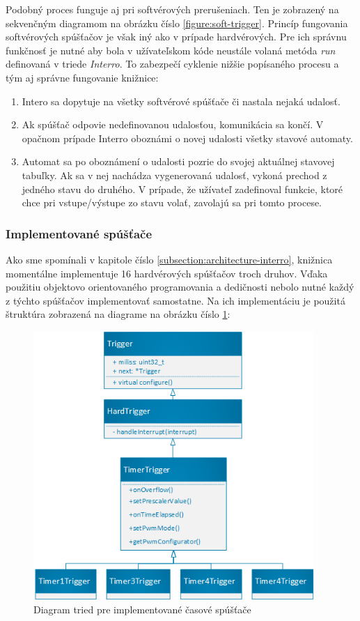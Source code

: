 Podobný proces funguje aj pri softvérových prerušeniach. Ten je zobrazený na sekvenčným diagramom na obrázku číslo \ref{figure:soft-trigger}.
Princíp fungovania softvérových spúšťačov je však iný ako v prípade hardvérových. Pre ich správnu funkčnosť je nutné aby bola v užívateľskom kóde neustále
volaná metóda \textit{run} definovaná v triede \textit{Interro}. To zabezpečí cyklenie nižšie popísaného procesu a tým aj správne fungovanie knižnice:

\begin{enumerate}
    \item Intero sa dopytuje na všetky softvérové spúšťače či nastala nejaká udalosť.
    \item Ak spúšťač odpovie nedefinovanou udalosťou, komunikácia sa končí. V opačnom prípade Interro oboznámi o novej udalosti všetky stavové automaty.
    \item Automat sa po oboznámení o udalosti pozrie do svojej aktuálnej stavovej tabuľky. Ak sa v nej nachádza vygenerovaná udalosť, vykoná prechod z jedného stavu do druhého.
          V prípade, že užívateľ zadefinoval funkcie, ktoré chce pri vstupe/výstupe zo stavu volať, zavolajú sa pri tomto procese.
\end{enumerate}

\subsubsection{Implementované spúšťače}

Ako sme spomínali v kapitole číslo \ref{subsection:architecture-interro}, knižnica momentálne implementuje 16 hardvérových spúšťačov troch druhov. Vďaka použitiu
objektovo orientovaného programovania a dedičnosti nebolo nutné každý z týchto spúšťačov implementovať samostatne.
Na ich implementáciu je použitá štruktúra zobrazená na diagrame na obrázku číslo \ref{figure:timer-class-diagram}:
\begin{figure}[!h]
    \centering
    \includegraphics[width=0.95\textwidth]{img/timer-class-diagram.png}
    \caption{Diagram tried pre implementované časové spúšťače}
    \label{figure:timer-class-diagram}
\end{figure}

